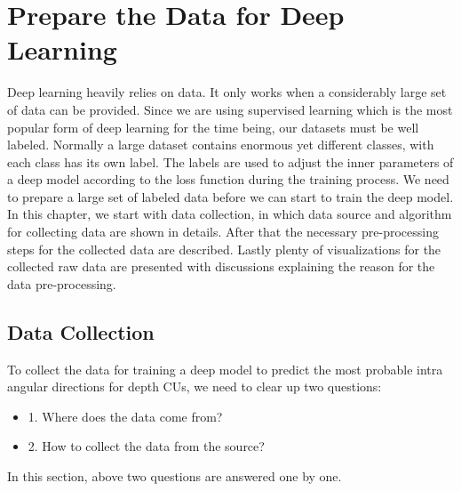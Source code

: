 \chapter{Prepare the Data for Deep Learning}\label{ch:chapter3} %

Deep learning heavily relies
on data.
It only works when a considerably large set of data can be provided.
Since we are using supervised learning which is the most
popular form of deep learning for the time being, our datasets
must be well labeled.
Normally a large dataset contains enormous yet different classes,
with each class has its own label.
The labels are used to adjust the inner parameters of a
deep model according to the loss function during the training
process.
We need to prepare a large set of labeled data before 
we can start to train the deep model.
In this chapter, we start with data collection, in which data source
and algorithm for collecting data are shown in details.
After that the necessary pre-processing steps for the collected 
data are described.
Lastly plenty of visualizations for the collected raw data 
are presented with
discussions explaining the reason for the data pre-processing.

\section{Data Collection}\label{sec:data-collection}
To collect the data for training a deep model to predict the most probable
intra angular directions for depth CUs, we need to clear up two questions:
\begin{itemize}
    \item 1. Where does the data come from?
    \item 2. How to collect the data from the source?
\end{itemize}
In this section, above two questions are answered one by one.

